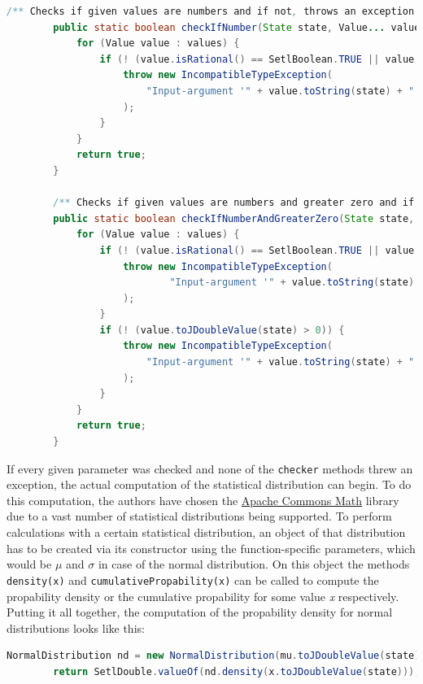  \newpage
 \begin{center}
	\begin{lstlisting}[caption={Checker methods}, language={java}, label=lis:checkerMethods]
		/** Checks if given values are numbers and if not, throws an exception */
		public static boolean checkIfNumber(State state, Value... values) throws IncompatibleTypeException {
			for (Value value : values) {
				if (! (value.isRational() == SetlBoolean.TRUE || value.isDouble() == SetlBoolean.TRUE)) {
					throw new IncompatibleTypeException(
						"Input-argument '" + value.toString(state) + "' is not a number."
					);
				}
			}
			return true;
		}

		/** Checks if given values are numbers and greater zero and if not, throws an exception */
		public static boolean checkIfNumberAndGreaterZero(State state, Value... values) throws SetlException {
			for (Value value : values) {
				if (! (value.isRational() == SetlBoolean.TRUE || value.isDouble() == SetlBoolean.TRUE)) {
					throw new IncompatibleTypeException(
							"Input-argument '" + value.toString(state) + "' is not a number."
					);
				}
				if (! (value.toJDoubleValue(state) > 0)) {
					throw new IncompatibleTypeException(
						"Input-argument '" + value.toString(state) + "' is not greater than zero."
					);
				}
			}
			return true;
		}
	\end{lstlisting}
\end{center}

If every given parameter was checked and none of the \lstinline{checker} methods threw an exception, the actual computation of the statistical distribution can begin. To do this computation, the authors have chosen the \href{http://commons.apache.org/proper/commons-math/userguide/distribution.html}{Apache Commons Math} library due to a vast number of statistical distributions being supported. To perform calculations with a certain statistical distribution, an object of that distribution has to be created via its constructor using the function-specific parameters, which would be $\mu$ and $\sigma$ in case of the normal distribution. On this object the methods \lstinline{density(x)} and \lstinline{cumulativePropability(x)} can be called to compute the propability density or the cumulative propability for some value \textit{x} respectively. Putting it all together, the computation of the propability density for normal distributions looks like this:

\begin{center}
	\begin{lstlisting}[caption={Normal Distribution propability density computation}, language={java}, label=lis:densityComputation]
		NormalDistribution nd = new NormalDistribution(mu.toJDoubleValue(state), sigma.toJDoubleValue(state));
        return SetlDouble.valueOf(nd.density(x.toJDoubleValue(state)));
	\end{lstlisting}
\end{center}

